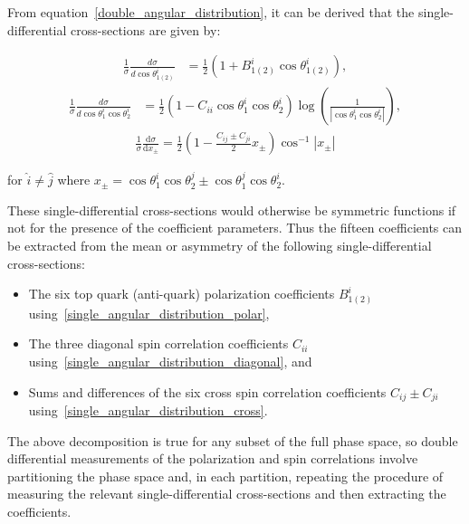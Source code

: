 \begin{refsection}
From equation~\ref{double_angular_distribution}, it can be derived that the single-differential cross-sections are given by:
\begin{linenomath*}
\begin{align}
\frac{1}{\sigma} \frac{d \sigma}{d \cos \theta_{1(2)}^i} & =\frac{1}{2}\left(1+B_{1(2)}^{i} \cos \theta_{1(2)}^i\right),
\label{single_angular_distribution_polar}
\end{align}
\begin{align}
\frac{1}{\sigma} \frac{d \sigma}{d \cos \theta_1^i \cos \theta_2^i} & =\frac{1}{2}\left(1 - C_{ii} \cos \theta_1^i \cos \theta_2^i\right) \log \left(\frac{1}{\left \vert \cos \theta_1^i \cos \theta_2^i\right \vert}\right),
\label{single_angular_distribution_diagonal}
\end{align}
\begin{align}
\frac{1}{\sigma} \frac{\mathrm{d} \sigma}{\mathrm{d} x_{\pm}} = \frac{1}{2} \left(1-\frac{C_{ij} \pm C_{ji}}{2} {x_{\pm}} \right) \cos ^{-1} \left \vert x_{\pm} \right \vert
\label{single_angular_distribution_cross}
\end{align}
\end{linenomath*}
\begin{center}
for $\hat{i} \neq \hat{j}$ where $x_{\pm} = \cos \theta_1^i \cos \theta_2^j \pm \cos \theta_1^j \cos \theta_2^i$.
\end{center}
These single-differential cross-sections would otherwise be symmetric functions if not for the presence of the coefficient parameters.
Thus the fifteen coefficients can be extracted from the mean or asymmetry of the following single-differential cross-sections:
\begin{itemize}
\item The six top quark (anti-quark) polarization coefficients $B_{1(2)}^{i}$ using~\ref{single_angular_distribution_polar},
\item  The three diagonal spin correlation coefficients $C_{ii}$ using~\ref{single_angular_distribution_diagonal}, and
\item  Sums and differences of the six cross spin correlation coefficients $C_{ij} \pm C_{ji}$ using~\ref{single_angular_distribution_cross}.
\end{itemize}

The above decomposition is true for any subset of the full phase space, so double differential measurements of the polarization and spin correlations involve partitioning the phase space and, in each partition, repeating the procedure of measuring the relevant single-differential cross-sections and then extracting the coefficients.


\end{refsection}
